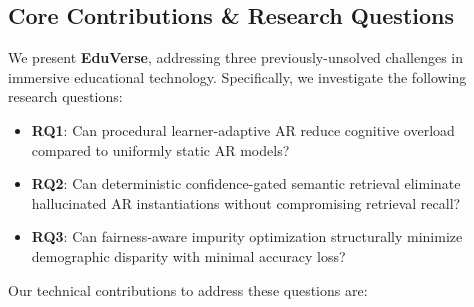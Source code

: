 \documentclass[conference]{IEEEtran}
\begin{document}
\subsection{Core Contributions \& Research Questions}

We present \textbf{EduVerse}, addressing three previously-unsolved challenges in immersive educational technology. Specifically, we investigate the following research questions:
\begin{itemize}
    \item \textbf{RQ1}: Can procedural learner-adaptive AR reduce cognitive overload compared to uniformly static AR models?
    \item \textbf{RQ2}: Can deterministic confidence-gated semantic retrieval eliminate hallucinated AR instantiations without compromising retrieval recall?
    \item \textbf{RQ3}: Can fairness-aware impurity optimization structurally minimize demographic disparity with minimal accuracy loss?
\end{itemize}

Our technical contributions to address these questions are:
\end{document}
